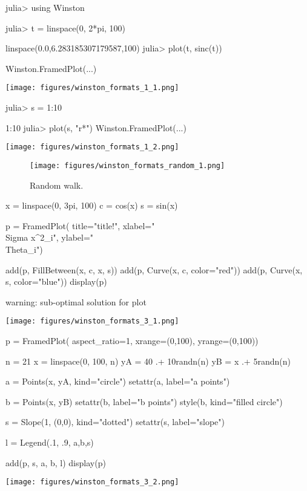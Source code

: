 
\begin{juliaterm}
julia> using Winston

julia> t = linspace(0, 2*pi, 100)

linspace(0.0,6.283185307179587,100)
julia> plot(t, sinc(t))

Winston.FramedPlot(...)
\end{juliaterm}
\texttt{[image: figures/winston\_formats\_1\_1.png]}

\begin{juliaterm}
julia> s = 1:10

1:10
julia> plot(s, "r*")
Winston.FramedPlot(...)
\end{juliaterm}
\texttt{[image: figures/winston\_formats\_1\_2.png]}





\begin{figure}[htpb]
\center
\texttt{[image: figures/winston\_formats\_random\_1.png]}
\caption{Random walk.}
\label{fig:random}
\end{figure}




\begin{juliacode}
x = linspace(0, 3pi, 100)
c = cos(x)
s = sin(x)

p = FramedPlot(
         title="title!",
         xlabel="\\Sigma x^2_i",
         ylabel="\\Theta_i")

add(p, FillBetween(x, c, x, s))
add(p, Curve(x, c, color="red"))
add(p, Curve(x, s, color="blue"))
display(p)

\end{juliacode}
\begin{juliaout}
warning: sub-optimal solution for plot
\end{juliaout}
\texttt{[image: figures/winston\_formats\_3\_1.png]}

\begin{juliacode}

p = FramedPlot(
     aspect_ratio=1,
     xrange=(0,100),
     yrange=(0,100))

n = 21
x = linspace(0, 100, n)
yA = 40 .+ 10randn(n)
yB = x .+ 5randn(n)

a = Points(x, yA, kind="circle")
setattr(a, label="a points")

b = Points(x, yB)
setattr(b, label="b points")
style(b, kind="filled circle")

s = Slope(1, (0,0), kind="dotted")
setattr(s, label="slope")

l = Legend(.1, .9, {a,b,s})

add(p, s, a, b, l)
display(p)
\end{juliacode}
\texttt{[image: figures/winston\_formats\_3\_2.png]}
